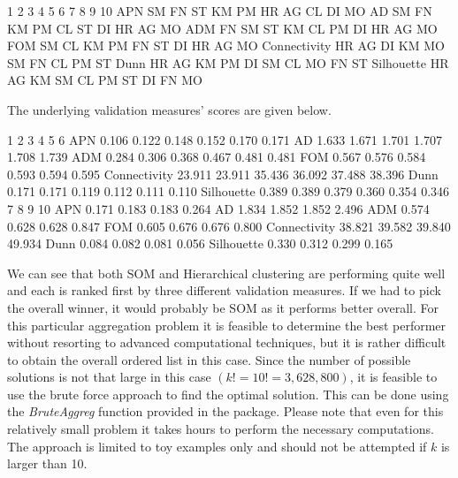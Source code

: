 \documentclass[11pt]{article}
\begin{document}
\begin{Schunk}
\begin{Soutput}
             1  2  3  4  5  6  7  8  9  10
APN          SM FN ST KM PM HR AG CL DI MO
AD           SM FN KM PM CL ST DI HR AG MO
ADM          FN SM ST KM CL PM DI HR AG MO
FOM          SM CL KM PM FN ST DI HR AG MO
Connectivity HR AG DI KM MO SM FN CL PM ST
Dunn         HR AG KM PM DI SM CL MO FN ST
Silhouette   HR AG KM SM CL PM ST DI FN MO
\end{Soutput}
\end{Schunk}
The underlying validation measures' scores are given below.
\begin{Schunk}
\begin{Soutput}
                  1      2      3      4      5      6
APN           0.106  0.122  0.148  0.152  0.170  0.171
AD            1.633  1.671  1.701  1.707  1.708  1.739
ADM           0.284  0.306  0.368  0.467  0.481  0.481
FOM           0.567  0.576  0.584  0.593  0.594  0.595
Connectivity 23.911 23.911 35.436 36.092 37.488 38.396
Dunn          0.171  0.171  0.119  0.112  0.111  0.110
Silhouette    0.389  0.389  0.379  0.360  0.354  0.346
                  7      8      9     10
APN           0.171  0.183  0.183  0.264
AD            1.834  1.852  1.852  2.496
ADM           0.574  0.628  0.628  0.847
FOM           0.605  0.676  0.676  0.800
Connectivity 38.821 39.582 39.840 49.934
Dunn          0.084  0.082  0.081  0.056
Silhouette    0.330  0.312  0.299  0.165
\end{Soutput}
\end{Schunk}

We can see that both SOM and Hierarchical clustering are performing quite well and each is ranked first by
three different validation measures. If we had to pick the overall winner, it would probably be SOM as it 
performs better overall. For this particular aggregation problem it is feasible to determine the best 
performer without resorting to advanced computational techniques, but it is rather difficult to obtain the overall 
ordered list in this case. Since the number of possible solutions is not that large in this case 
$(k!=10! = 3,628,800)$, it is feasible to use the brute force approach to find the optimal solution.
This can be done using the \emph{BruteAggreg} function provided in the package. Please note 
that even for this relatively small problem it takes hours to perform the necessary computations. The approach
is limited to toy examples only and should not be attempted if $k$ is larger than 10.
\end{document}
